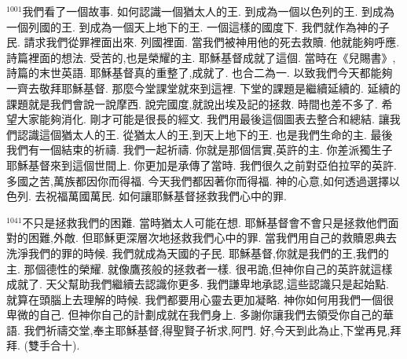\documentclass{book}
\begin{document}
$^{1001}$我們看了一個故事.
如何認識一個猶太人的王.
到成為一個以色列的王.
到成為一個列國的王.
到成為一個天上地下的王.
一個這樣的國度下.
我們就作為神的子民.
請求我們從罪裡面出來.
列國裡面.
當我們被神用他的死去救贖.
他就能夠呼應.
詩篇裡面的想法.
受苦的,也是榮耀的主.
耶穌基督成就了這個.
當時在《兒賜書》,詩篇的末世英語.
耶穌基督真的重整了,成就了.
也合二為一.
以致我們今天都能夠一齊去敬拜耶穌基督.
那麼今堂課堂就來到這裡.
下堂的課題是繼續延續的.
延續的課題就是我們會說一說摩西.
說完國度,就說出埃及記的拯救.
時間也差不多了.
希望大家能夠消化.
剛才可能是很長的經文.
我們用最後這個圖表去整合和總結.
讓我們認識這個猶太人的王.
從猶太人的王,到天上地下的王.
也是我們生命的主.
最後我們有一個結束的祈禱.
我們一起祈禱.
你就是那個信實,英許的主.
你差派獨生子耶穌基督來到這個世間上.
你更加是承傳了當時.
我們很久之前對亞伯拉罕的英許.
多國之苦,萬族都因你而得福.
今天我們都因著你而得福.
神的心意,如何透過選擇以色列.
去祝福萬國萬民.
如何讓耶穌基督拯救我們心中的罪.

$^{1041}$不只是拯救我們的困難.
當時猶太人可能在想.
耶穌基督會不會只是拯救他們面對的困難,外敵.
但耶穌更深層次地拯救我們心中的罪.
當我們用自己的救贖恩典去洗淨我們的罪的時候.
我們就成為天國的子民.
耶穌基督,你就是我們的王,我們的主.
那個德性的榮耀.
就像鷹孩般的拯救者一樣.
很弔詭,但神你自己的英許就這樣成就了.
天父幫助我們繼續去認識你更多.
我們謙卑地承認,這些認識只是起始點.
就算在頭腦上去理解的時候.
我們都要用心靈去更加凝略.
神你如何用我們一個很卑微的自己.
但神你自己的計劃成就在我們身上.
多謝你讓我們去領受你自己的華語.
我們祈禱交堂,奉主耶穌基督,得聖賢子祈求,阿門.
好,今天到此為止,下堂再見,拜拜.
(雙手合十).
\newpage
\end{document}
